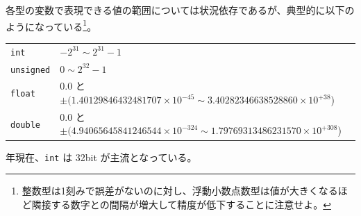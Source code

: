 各型の変数で表現できる値の範囲については状況依存であるが、典型的に以下のようになっている\footnote{整数型は1刻みで誤差がないのに対し、浮動小数点数型は値が大きくなるほど隣接する数字との間隔が増大して精度が低下することに注意せよ。}。
\begin{table}[H]
    \centering
    \begin{tabular}{ll}
        \texttt{int}      & \(-2^{31}\sim 2^{31}-1\)                                                                           \\
        \texttt{unsigned} & \(0\sim 2^{32}-1\)                                                                                 \\
        \texttt{float}    & {\small 0.0 と \(\pm(1.40129846432481707\times10^{-45}\sim 3.40282346638528860\times10^{+38}\))}   \\
        \texttt{double}   & {\small 0.0 と \(\pm(4.94065645841246544\times10^{-324}\sim 1.79769313486231570\times10^{+308}\))}
    \end{tabular}
\end{table} \noindent
\nendo 年現在、\texttt{int} は 32bit が主流となっている。

